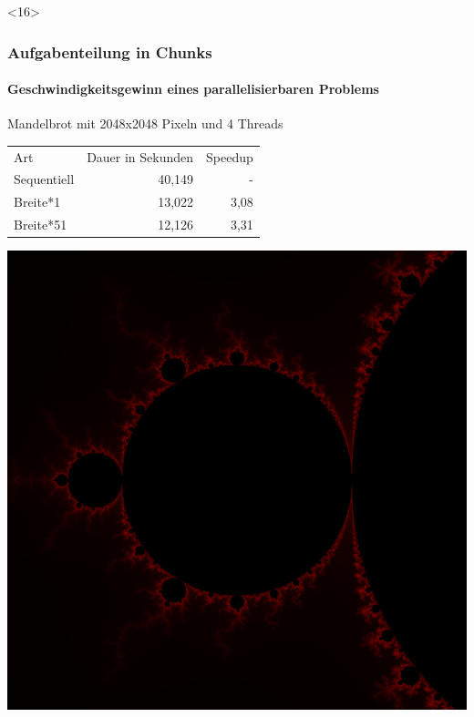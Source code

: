 \documentclass{beamer}
\begin{document}
\begin{frame}<16>
  \frametitle{Aufgabenteilung in Chunks}
  \framesubtitle{Geschwindigkeitsgewinn eines parallelisierbaren Problems}
  
  \begin{center}
    Mandelbrot mit 2048x2048 Pixeln und 4 Threads
  \end{center}
  
  \begin{center}
    \begin{table}[]
      \begin{tabular}{lrr}
        Art & Dauer in Sekunden & Speedup \\
        Sequentiell & 40,149 & - \\
        Breite*1 & 13,022 & 3,08 \\
        Breite*51 & 12,126 & 3,31
      \end{tabular}
    \end{table}
  \end{center}
  
  \begin{center}
    \includegraphics[scale=0.0625]{mandelbrot}
  \end{center}

\end{frame}
\end{document}
